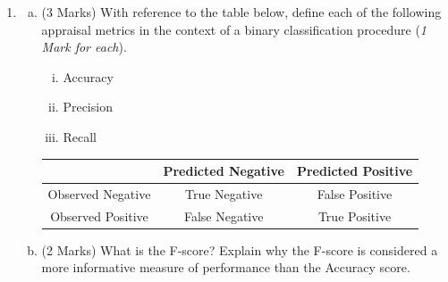 \documentclass[a4paper,12pt]{article}
\begin{document}
\begin{enumerate}
\begin{enumerate}[(a)]
\begin{enumerate}[(i)]
%
\end{enumerate}
	
%		
%		


	\end{enumerate}
\newpage
	\item 


 
	\begin{enumerate}[(a)]



		\item (3 Marks) With reference to the table below, define each of the following appraisal metrics in the context of a binary classification procedure (\textit{1 Mark for each}).
		\begin{enumerate}[(i)]
			\item Accuracy
			\item Precision
			\item Recall
		\end{enumerate}
		\begin{center}
		\begin{tabular}{|c|c|c|}
			\hline  & Predicted Negative & Predicted Positive \\ 
			\hline Observed Negative & True Negative & False Positive \\ 
			\hline Observed Positive & False Negative & True Positive \\ 
			\hline 
		\end{tabular} 
	\end{center}
\bigskip
		\item (2 Marks) What is the F-score? Explain why the F-score is considered a more informative measure of performance than the Accuracy score.
		

\end{enumerate}
\end{enumerate}
\end{document}
